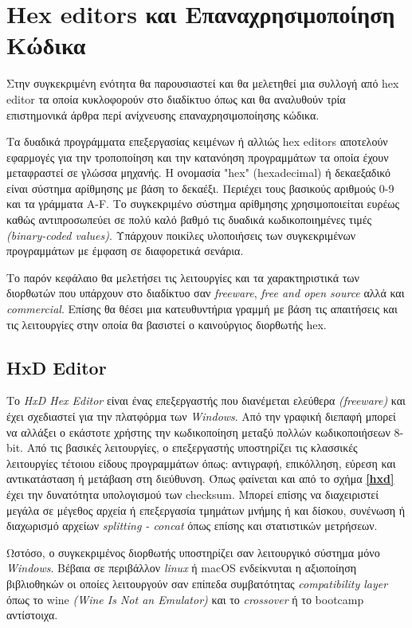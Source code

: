 \section{Hex editors και Επαναχρησιμοποίηση Κώδικα}
Στην συγκεκριμένη ενότητα θα παρουσιαστεί και θα μελετηθεί μια συλλογή από hex editor τα οποία κυκλοφορούν στο διαδίκτυο όπως και θα αναλυθούν τρία επιστημονικά άρθρα περί ανίχνευσης επαναχρησιμοποίησης κώδικα.

Τα δυαδικά προγράμματα επεξεργασίας κειμένων ή αλλιώς hex editors αποτελούν εφαρμογές για την τροποποίηση και την κατανόηση προγραμμάτων τα οποία έχουν μεταφραστεί σε γλώσσα μηχανής.
H ονομασία "hex" (hexadecimal) ή δεκαεξαδικό είναι σύστημα αρίθμησης με βάση το δεκαέξι.
Περιέχει τους βασικούς αριθμούς 0-9 και τα γράμματα A-F.
Το συγκεκριμένο σύστημα αρίθμησης χρησιμοποιείται ευρέως καθώς αντιπροσωπεύει σε πολύ καλό βαθμό τις δυαδικά κωδικοποιημένες τιμές \emph{(binary-coded values)}.
Υπάρχουν ποικίλες υλοποιήσεις των συγκεκριμένων προγραμμάτων με έμφαση σε διαφορετικά σενάρια.

Το παρόν κεφάλαιο θα μελετήσει τις λειτουργίες και τα χαρακτηριστικά των διορθωτών που υπάρχουν στο διαδίκτυο σαν \emph{freeware}, \emph{free and open source} αλλά και \emph{commercial}.
Επίσης θα θέσει μια κατευθυντήρια γραμμή με βάση τις απαιτήσεις και τις λειτουργίες στην οποία θα βασιστεί ο καινούργιος διορθωτής hex.

\pagebreak
\subsection{HxD Editor}
Το \emph{HxD Hex Editor}\cite{hxd} είναι ένας επεξεργαστής που διανέμεται ελεύθερα \emph{(freeware)} και έχει σχεδιαστεί για την πλατφόρμα των \emph{Windows}.
Από την γραφική διεπαφή μπορεί να αλλάξει ο εκάστοτε χρήστης την κωδικοποίηση μεταξύ πολλών κωδικοποιήσεων 8-bit.
Από τις βασικές λειτουργίες, ο επεξεργαστής υποστηρίζει τις κλασσικές λειτουργίες τέτοιου είδους προγραμμάτων όπως: αντιγραφή, επικόλληση, εύρεση και αντικατάσταση ή μετάβαση στη διεύθυνση.
Όπως φαίνεται και από το σχήμα \textbf{\ref{hxd}} έχει την δυνατότητα υπολογισμού των checksum.
Μπορεί επίσης να διαχειριστεί μεγάλα σε μέγεθος αρχεία ή επεξεργασία τμημάτων μνήμης ή και δίσκου, συνένωση ή διαχωρισμό αρχείων \emph{splitting - concat} όπως επίσης και στατιστικών μετρήσεων.

Ωστόσο, ο συγκεκριμένος διορθωτής υποστηρίζει σαν λειτουργικό σύστημα μόνο \emph{Windows}.
Βέβαια σε περιβάλλον \emph{linux} ή {macOS} ενδείκνυται η αξιοποίηση βιβλιοθηκών οι οποίες λειτουργούν σαν επίπεδα συμβατότητας \emph{compatibility layer} όπως το wine \emph{(Wine Is Not an Emulator)} και το \emph{crossover} ή το {bootcamp} αντίστοιχα.

